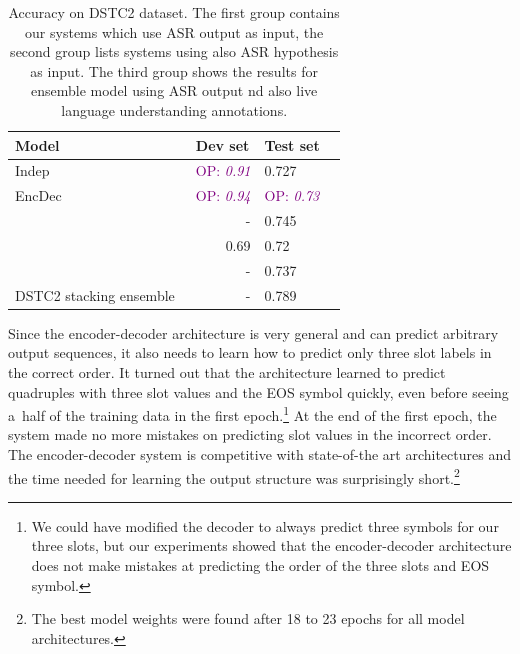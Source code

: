 \documentclass{itatnew}
\def\OP#1{\textcolor{purple}{OP: \textit{#1}}}
\begin{document}
\begin{table}
\vspace{-0.80em}
\begin{center}
\begin{tabular}{l@{\quad}rll}
\hline
\multicolumn{1}{l}{\rule{0pt}{12pt}
                   Model}&\multicolumn{1}{l}{Dev set}&\multicolumn{2}{l}{Test set}\\[2pt]
\hline\rule{0pt}{12pt}
    Indep  &   \OP{0.91} & 0.727 \\
    EncDec &   \OP{0.94} & \OP{0.73} \\
\hline
    \citet{vodolan2015hybrid} & - & 0.745 \\
    \citet{zilka2015incremental} & 0.69 & 0.72 \\
    \citet{henderson2013deep} & - & 0.737 \\
\hline
    DSTC2 stacking ensemble~\cite{henderson2014second} & - & 0.789 \\
\hline
\end{tabular}
\caption{Accuracy on DSTC2 dataset. The first group contains our systems which use ASR output as input, the second group lists systems using also ASR hypothesis as input. The third group shows the results for ensemble model using ASR output nd also live language understanding annotations.}
\vspace{-2em}
\end{center}
\label{tab:dstc}
\end{table}

Since the encoder-decoder architecture is very general and can predict arbitrary output sequences, it also needs to learn how to predict only three slot labels in the correct order.
It turned out that the architecture learned to predict quadruples with three slot values and the EOS symbol quickly, even before seeing a~half of the training data in the first epoch.\footnote{We could have modified the decoder to always predict three symbols for our three slots, but our experiments showed that the encoder-decoder architecture does not make mistakes at predicting the order of the three slots and EOS symbol.}  
At the end of the first epoch, the system made no more mistakes on predicting slot values in the incorrect order.
The encoder-decoder system is competitive with state-of-the art architectures and the time needed for learning the output structure was surprisingly short.\footnote{The best model weights were found after 18 to 23 epochs for all model architectures.}
\end{document}
